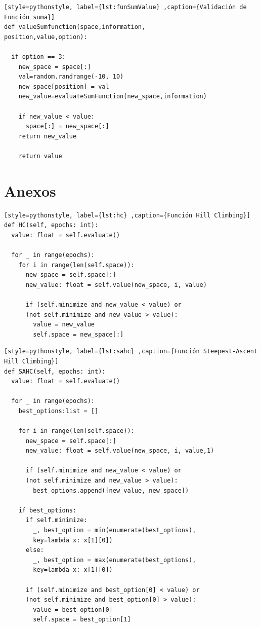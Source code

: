 \documentclass[12pt,twoside]{article}
\begin{document}
\begin{lstlisting}[style=pythonstyle, label={lst:funSumValue} ,caption={Validación de Función suma}]
def valueSumfunction(space,information,
position,value,option):

  if option == 3:
    new_space = space[:]
    val=random.randrange(-10, 10)
    new_space[position] = val
    new_value=evaluateSumFunction(new_space,information)

    if new_value < value:    
      space[:] = new_space[:]
    return new_value

	return value

\end{lstlisting}


\clearpage
\section{Anexos}

\begin{lstlisting}[style=pythonstyle, label={lst:hc} ,caption={Función Hill Climbing}]
def HC(self, epochs: int):
  value: float = self.evaluate()

  for _ in range(epochs):
    for i in range(len(self.space)):
      new_space = self.space[:]
      new_value: float = self.value(new_space, i, value)

      if (self.minimize and new_value < value) or 
      (not self.minimize and new_value > value):
        value = new_value
        self.space = new_space[:]
\end{lstlisting}

\begin{lstlisting}[style=pythonstyle, label={lst:sahc} ,caption={Función Steepest-Ascent Hill Climbing}]
def SAHC(self, epochs: int):
  value: float = self.evaluate()

  for _ in range(epochs):
    best_options:list = []

    for i in range(len(self.space)):
      new_space = self.space[:]
      new_value: float = self.value(new_space, i, value,1)

      if (self.minimize and new_value < value) or 
      (not self.minimize and new_value > value):
        best_options.append([new_value, new_space])

    if best_options: 
      if self.minimize:
        _, best_option = min(enumerate(best_options), 
        key=lambda x: x[1][0])
      else:    
        _, best_option = max(enumerate(best_options), 
        key=lambda x: x[1][0])
      
      if (self.minimize and best_option[0] < value) or 
      (not self.minimize and best_option[0] > value):
        value = best_option[0]  
        self.space = best_option[1]  
\end{lstlisting}
\end{document}
